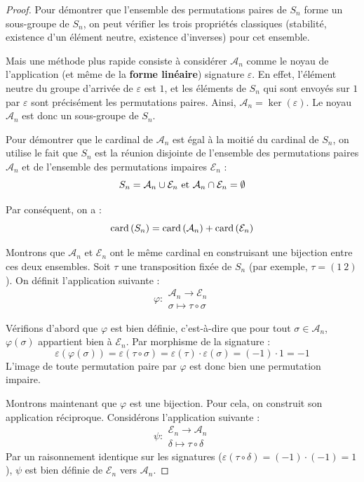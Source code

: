 \documentclass[12pt, a4paper]{report}
\begin{document}
\begin{proof}
    Pour démontrer que l'ensemble des permutations paires de $S_n$ forme un sous-groupe de $S_n$, on peut vérifier les trois propriétés classiques (stabilité, existence d'un élément neutre, existence d'inverses) pour cet ensemble.
    
    Mais une méthode plus rapide consiste à considérer $\mathcal{A}_n$ comme le noyau de l'application (et même de la \textbf{forme linéaire}) signature $\varepsilon$. En effet, l'élément neutre du groupe d'arrivée de $\varepsilon$ est $1$, et les éléments de $S_n$ qui sont envoyés sur $1$ par $\varepsilon$ sont précisément les permutations paires. Ainsi, $\mathcal{A}_n = \ker(\varepsilon)$. Le noyau $\mathcal{A}_n$ est donc un sous-groupe de $S_n$.

    Pour démontrer que le cardinal de $\mathcal{A}_n$ est égal à la moitié du cardinal de $S_n$, on utilise le fait que $S_n$ est la réunion disjointe de l'ensemble des permutations paires $\mathcal{A}_n$ et de l'ensemble des permutations impaires $\mathcal{E}_n$ :
    $$S_n = \mathcal{A}_n \cup \mathcal{E}_n \text{ et } \mathcal{A}_n \cap \mathcal{E}_n = \emptyset$$
    
    Par conséquent, on a :
    $$\mathrm{card}\left(S_n\right) = \mathrm{card}\left(\mathcal{A}_n\right) + \mathrm{card}\left(\mathcal{E}_n\right)$$

    Montrons que $\mathcal{A}_n$ et $\mathcal{E}_n$ ont le même cardinal en construisant une bijection entre ces deux ensembles. Soit $\tau$ une transposition fixée de $S_n$ (par exemple, $\tau = (1 \ 2)$). On définit l'application suivante :
    $$\varphi : \begin{matrix} \mathcal{A}_n \to \mathcal{E}_n \\ \sigma \mapsto \tau \circ \sigma \end{matrix}$$

    Vérifions d'abord que $\varphi$ est bien définie, c'est-à-dire que pour tout $\sigma \in \mathcal{A}_n$, $\varphi(\sigma)$ appartient bien à $\mathcal{E}_n$. Par morphisme de la signature :
    $$\varepsilon(\varphi(\sigma)) = \varepsilon(\tau \circ \sigma) = \varepsilon(\tau) \cdot \varepsilon(\sigma) = (-1) \cdot 1 = -1$$
    L'image de toute permutation paire par $\varphi$ est donc bien une permutation impaire.

    Montrons maintenant que $\varphi$ est une bijection. Pour cela, on construit son application réciproque. Considérons l'application suivante :
    $$\psi : \begin{matrix} \mathcal{E}_n \to \mathcal{A}_n \\ \delta \mapsto \tau \circ \delta \end{matrix}$$
    Par un raisonnement identique sur les signatures ($\varepsilon(\tau \circ \delta) = (-1) \cdot (-1) = 1$), $\psi$ est bien définie de $\mathcal{E}_n$ vers $\mathcal{A}_n$.


\end{proof}
\end{document}
